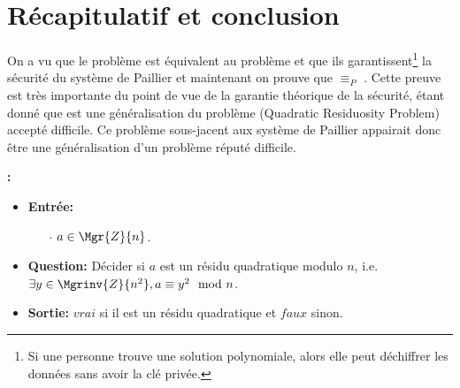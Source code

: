 	\section{Récapitulatif et conclusion}




	On a vu que le problème  est équivalent au problème  et que ils garantissent\footnote{Si une 
		personne trouve une solution polynomiale, alors elle peut déchiffrer les données sans avoir la clé privée.} la sécurité 
	du système de Paillier et maintenant on prouve que  $\equiv_P$ . Cette preuve est très importante 
	du point de vue de la garantie théorique de la sécurité, étant donné que  est une généralisation du problème 
	 (Quadratic Residuosity Problem) accepté difficile. Ce problème sous-jacent aux système de Paillier appairait 
	donc être une généralisation d'un problème réputé difficile.
	

\begin{problem} \textbf{:}%
	\begin{rm}
		\begin{itemize}	
		\renewcommand{\labelitemi}{}
		\item\textbf{Entrée:}
			
			\begin{itemize}
				\item[$\cdot$] $a\in \Mgr{Z}{n}$.
			\end{itemize}

		\item\textbf{Question:} Décider si $a$ est un résidu quadratique modulo $n$, i.e. $\exists y \in \Mgrinv{Z}{n^2}, a \equiv y^2 \mod{n}$.

		\item\textbf{Sortie:}
			$vrai$ si il est un résidu quadratique et $faux$ sinon.
		\end{itemize}
	\end{rm}	
\end{problem}


